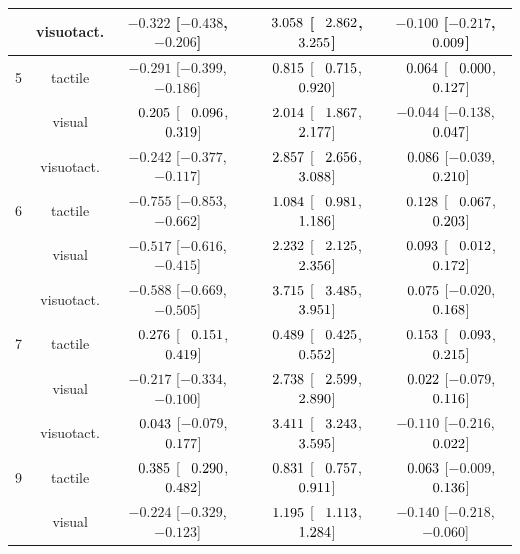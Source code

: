 \begin{longtable}{lcccc}
 & visuotact. & $-0.322$ [$-0.438$, $-0.206$] & $\hphantom{-}3.058$ [$\hphantom{-}2.862$, $\hphantom{-}3.255$] & \cellcolor{gray!15}$-0.100$ [$-0.217$, $\hphantom{-}0.009$] \\
\midrule
5 & tactile & $-0.291$ [$-0.399$, $-0.186$] & $\hphantom{-}0.815$ [$\hphantom{-}0.715$, $\hphantom{-}0.920$] & $\hphantom{-}0.064$ [$\hphantom{-}0.000$, $\hphantom{-}0.127$] \\
 & visual & $\hphantom{-}0.205$ [$\hphantom{-}0.096$, $\hphantom{-}0.319$] & $\hphantom{-}2.014$ [$\hphantom{-}1.867$, $\hphantom{-}2.177$] & $-0.044$ [$-0.138$, $\hphantom{-}0.047$] \\
 & visuotact. & $-0.242$ [$-0.377$, $-0.117$] & $\hphantom{-}2.857$ [$\hphantom{-}2.656$, $\hphantom{-}3.088$] & $\hphantom{-}0.086$ [$-0.039$, $\hphantom{-}0.210$] \\
\midrule
6 & tactile & $-0.755$ [$-0.853$, $-0.662$] & $\hphantom{-}1.084$ [$\hphantom{-}0.981$, $\hphantom{-}1.186$] & $\hphantom{-}0.128$ [$\hphantom{-}0.067$, $\hphantom{-}0.203$] \\
 & visual & $-0.517$ [$-0.616$, $-0.415$] & $\hphantom{-}2.232$ [$\hphantom{-}2.125$, $\hphantom{-}2.356$] & $\hphantom{-}0.093$ [$\hphantom{-}0.012$, $\hphantom{-}0.172$] \\
 & visuotact. & $-0.588$ [$-0.669$, $-0.505$] & $\hphantom{-}3.715$ [$\hphantom{-}3.485$, $\hphantom{-}3.951$] & $\hphantom{-}0.075$ [$-0.020$, $\hphantom{-}0.168$] \\
\midrule
7 & tactile & $\hphantom{-}0.276$ [$\hphantom{-}0.151$, $\hphantom{-}0.419$] & $\hphantom{-}0.489$ [$\hphantom{-}0.425$, $\hphantom{-}0.552$] & \cellcolor{gray!15}$\hphantom{-}0.153$ [$\hphantom{-}0.093$, $\hphantom{-}0.215$] \\
 & visual & $-0.217$ [$-0.334$, $-0.100$] & $\hphantom{-}2.738$ [$\hphantom{-}2.599$, $\hphantom{-}2.890$] & \cellcolor{gray!15}$\hphantom{-}0.022$ [$-0.079$, $\hphantom{-}0.116$] \\
 & visuotact. & $\hphantom{-}0.043$ [$-0.079$, $\hphantom{-}0.177$] & $\hphantom{-}3.411$ [$\hphantom{-}3.243$, $\hphantom{-}3.595$] & \cellcolor{gray!15}$-0.110$ [$-0.216$, $\hphantom{-}0.022$] \\
\midrule
9 & tactile & $\hphantom{-}0.385$ [$\hphantom{-}0.290$, $\hphantom{-}0.482$] & $\hphantom{-}0.831$ [$\hphantom{-}0.757$, $\hphantom{-}0.911$] & \cellcolor{gray!15}$\hphantom{-}0.063$ [$-0.009$, $\hphantom{-}0.136$] \\
 & visual & $-0.224$ [$-0.329$, $-0.123$] & $\hphantom{-}1.195$ [$\hphantom{-}1.113$, $\hphantom{-}1.284$] & \cellcolor{gray!15}$-0.140$ [$-0.218$, $-0.060$] \\

\end{longtable}
